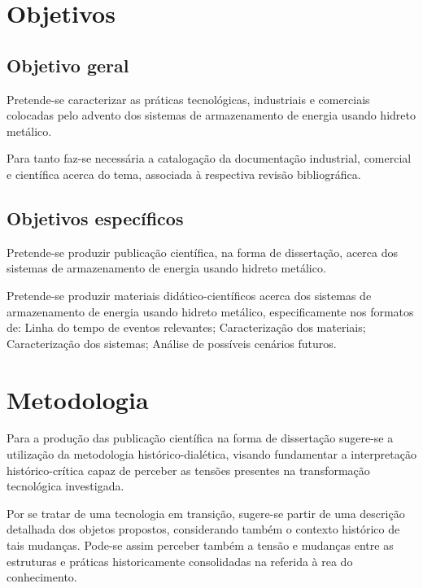 \documentclass[
   article,       %
   12pt,          %
   oneside,       %
   a4paper,       %
   english,       %
   brazil,           %
   sumario=tradicional
   ]{abntex2}
\begin{document}
\section{Objetivos}


\subsection{Objetivo geral}

Pretende-se caracterizar as práticas tecnológicas, industriais e comerciais colocadas pelo advento dos sistemas de armazenamento de energia usando hidreto metálico.

Para tanto faz-se necessária a catalogação da documentação industrial, comercial e científica acerca do tema, associada à respectiva revisão bibliográfica.

\subsection{Objetivos específicos}

Pretende-se produzir publicação científica, na forma de dissertação, acerca dos sistemas de armazenamento de energia usando hidreto metálico.

Pretende-se produzir materiais didático-científicos acerca dos sistemas de armazenamento de energia usando hidreto metálico, especificamente nos formatos de: Linha do tempo de eventos relevantes; Caracterização dos materiais; Caracterização dos sistemas; Análise de possíveis cenários futuros.








\section{Metodologia}

Para a produção das publicação científica na forma de dissertação sugere-se a utilização da metodologia histórico-dialética, visando fundamentar a interpretação histórico-crítica capaz de perceber as tensões presentes na transformação tecnológica investigada. 

Por se tratar de uma tecnologia em transição, sugere-se partir de uma descrição detalhada dos objetos propostos, considerando também o contexto histórico de tais mudanças. Pode-se assim perceber também a tensão e mudanças entre as estruturas e práticas historicamente consolidadas na referida à rea do conhecimento.
\end{document}
